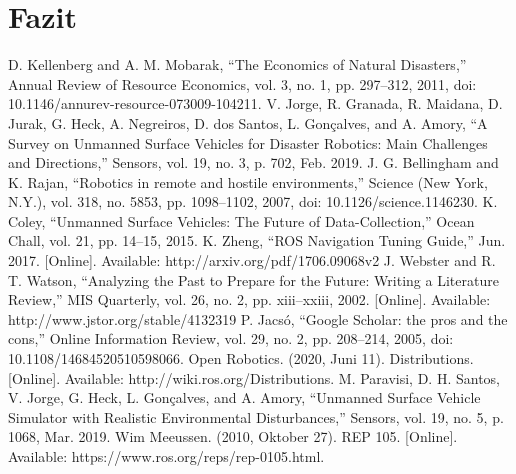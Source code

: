 \documentclass[conference]{IEEEtran}
\begin{document}
\section{Fazit}
\begin{thebibliography}{}
 D. Kellenberg and A. M. Mobarak, “The Economics of Natural Disasters,” Annual Review of Resource Economics, vol. 3, no. 1, pp. 297–312, 2011, doi: 10.1146/annurev-resource-073009-104211.
 V. Jorge, R. Granada, R. Maidana, D. Jurak, G. Heck, A. Negreiros, D. dos Santos, L. Gonçalves, and A. Amory, “A Survey on Unmanned Surface Vehicles for Disaster Robotics: Main Challenges and Directions,” Sensors, vol. 19, no. 3, p. 702, Feb. 2019.
 J. G. Bellingham and K. Rajan, “Robotics in remote and hostile environments,” Science (New York, N.Y.), vol. 318, no. 5853, pp. 1098–1102, 2007, doi: 10.1126/science.1146230.
 K. Coley, “Unmanned Surface Vehicles: The Future of Data-Collection,” Ocean Chall, vol. 21, pp. 14–15, 2015.
 K. Zheng, “ROS Navigation Tuning Guide,” Jun. 2017. [Online]. Available: http://arxiv.org/pdf/1706.09068v2
 J. Webster and R. T. Watson, “Analyzing the Past to Prepare for the Future: Writing a Literature Review,” MIS Quarterly, vol. 26, no. 2, pp. xiii–xxiii, 2002. [Online]. Available: http://www.jstor.org/stable/4132319
 P. Jacsó, “Google Scholar: the pros and the cons,” Online Information Review, vol. 29, no. 2, pp. 208–214, 2005, doi: 10.1108/14684520510598066.
 Open Robotics. (2020, Juni 11). Distributions. [Online]. Available: http://wiki.ros.org/Distributions.
 M. Paravisi, D. H. Santos, V. Jorge, G. Heck, L. Gonçalves, and A. Amory, “Unmanned Surface Vehicle Simulator with Realistic Environmental Disturbances,” Sensors, vol. 19, no. 5, p. 1068, Mar. 2019.
 Wim Meeussen. (2010, Oktober 27). REP 105. [Online]. Available: https://www.ros.org/reps/rep-0105.html.
\end{thebibliography}
\end{document}
